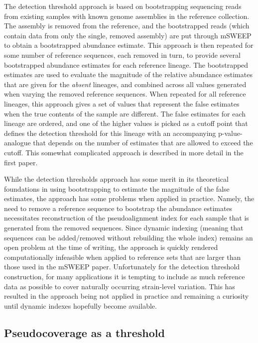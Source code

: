 \documentclass[officiallayout]{tktla}
\begin{document}
The detection threshold approach is based on bootstrapping sequencing
reads from existing samples with known genome assemblies in the
reference collection. The assembly is removed from the reference, and
the bootstrapped reads (which contain data from only the single,
removed assembly) are put through mSWEEP to obtain a bootstrapped
abundance estimate. This approach is then repeated for some number of
reference sequences, each removed in turn, to provide several
bootstrapped abundance estimates for each reference lineage. The
bootstrapped estimates are used to evaluate the magnitude of the
relative abundance estimates that are given for the \textit{absent}
lineages, and combined across all values generated when varying the
removed reference sequences. When repeated for all reference lineages,
this approach gives a set of values that represent the false estimates
when the true contents of the sample are different. The false estimates
for each lineage are ordered, and one of the higher values is picked
as a cutoff point that defines the detection threshold for this
lineage with an accompanying p-value-analogue that depends on the
number of estimates that are allowed to exceed the cutoff. This
somewhat complicated approach is described in more detail in the first
paper.

While the detection thresholds approach has some merit in its
theoretical foundations in using bootstrapping to estimate the
magnitude of the false estimates, the approach has some problems when
applied in practice. Namely, the need to remove a reference sequence
to bootstrap the abundance estimates necessitates reconstruction of the
pseudoalignment index for each sample that is generated from the
removed sequences. Since dynamic indexing (meaning that sequences can
be added/removed without rebuilding the whole index) remains an open
problem at the time of writing, the approach is quickly rendered
computationally infeasible when applied to reference sets that are
larger than those used in the mSWEEP paper. Unfortunately for the
detection threshold construction, for many applications it is tempting
to include as much reference data as possible to cover naturally
occurring strain-level variation. This has resulted in the approach
being not applied in practice and remaining a curiosity until dynamic
indexes hopefully become available.

\subsection{Pseudocoverage as a threshold}
\end{document}
